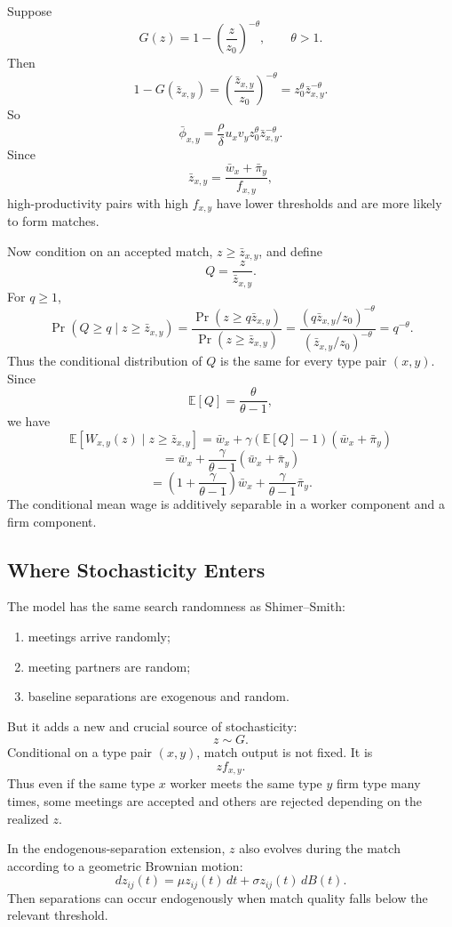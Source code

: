 \documentclass[11pt]{article}
\newcommand{\E}{\mathbb{E}}
\newcommand{\1}{\mathbf{1}}
\begin{document}
Suppose
\[
G(z)=1-\left(\frac{z}{z_0}\right)^{-\theta},
\qquad \theta>1.
\]
Then
\[
1-G(\bar z_{x,y})
=
\left(\frac{\bar z_{x,y}}{z_0}\right)^{-\theta}
=
z_0^\theta \bar z_{x,y}^{-\theta}.
\]
So
\[
\bar \phi_{x,y}
=
\frac{\rho}{\delta}u_xv_yz_0^\theta \bar z_{x,y}^{-\theta}.
\]
Since
\[
\bar z_{x,y}
=
\frac{\bar w_x+\bar \pi_y}{f_{x,y}},
\]
high-productivity pairs with high $f_{x,y}$ have lower thresholds and are more likely to form matches.

Now condition on an accepted match, $z\geq \bar z_{x,y}$, and define
\[
Q = \frac{z}{\bar z_{x,y}}.
\]
For $q\geq 1$,
\[
\Pr(Q\geq q\mid z\geq \bar z_{x,y})
=
\frac{\Pr(z\geq q\bar z_{x,y})}{\Pr(z\geq \bar z_{x,y})}
=
\frac{(q\bar z_{x,y}/z_0)^{-\theta}}{(\bar z_{x,y}/z_0)^{-\theta}}
=
q^{-\theta}.
\]
Thus the conditional distribution of $Q$ is the same for every type pair $(x,y)$. Since
\[
\E[Q]=\frac{\theta}{\theta-1},
\]
we have
\[
\E[W_{x,y}(z)\mid z\geq \bar z_{x,y}]
=
\bar w_x
+\gamma\left(\E[Q]-1\right)(\bar w_x+\bar \pi_y)
\]
\[
=
\bar w_x
+\frac{\gamma}{\theta-1}(\bar w_x+\bar \pi_y)
\]
\[
=
\left(1+\frac{\gamma}{\theta-1}\right)\bar w_x
+\frac{\gamma}{\theta-1}\bar \pi_y.
\]
The conditional mean wage is additively separable in a worker component and a firm component.

\subsection{Where Stochasticity Enters}

The model has the same search randomness as Shimer--Smith:
\begin{enumerate}
    \item meetings arrive randomly;
    \item meeting partners are random;
    \item baseline separations are exogenous and random.
\end{enumerate}

But it adds a new and crucial source of stochasticity:
\[
z \sim G.
\]
Conditional on a type pair $(x,y)$, match output is not fixed. It is
\[
z f_{x,y}.
\]
Thus even if the same type $x$ worker meets the same type $y$ firm type many times, some meetings are accepted and others are rejected depending on the realized $z$.

In the endogenous-separation extension, $z$ also evolves during the match according to a geometric Brownian motion:
\[
dz_{ij}(t)=\mu z_{ij}(t)\,dt+\sigma z_{ij}(t)\,dB(t).
\]
Then separations can occur endogenously when match quality falls below the relevant threshold.
\end{document}
